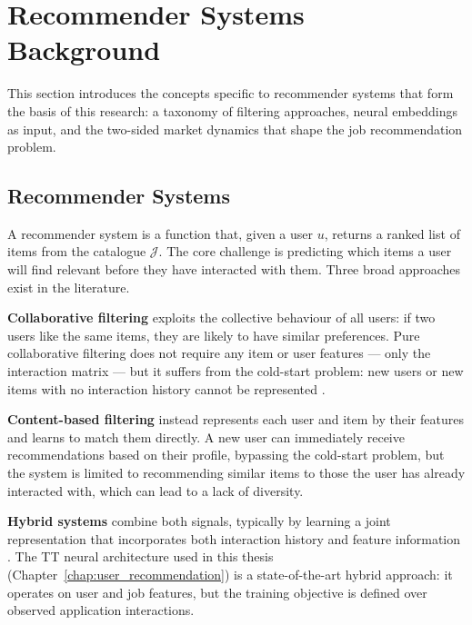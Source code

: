 \section{Recommender Systems Background}
\label{sec:prelim_rs_background}

This section introduces the concepts specific to recommender systems that form the basis of this research: a taxonomy of filtering approaches, neural embeddings as input, and the two-sided market dynamics that shape the job recommendation problem.

\subsection{Recommender Systems}
\label{sec:prelim_rs}

A recommender system is a function that, given a user $u$, returns a ranked list of items from the catalogue $\mathcal{J}$. The core challenge is predicting which items a user will find relevant before they have interacted with them. Three broad approaches exist in the literature.

\textbf{Collaborative filtering} \cite{glauber2019collaborativefilteringvscontentbased} exploits the collective behaviour of all users: if two users like the same items, they are likely to have similar preferences. Pure collaborative filtering does not require any item or user features --- only the interaction matrix --- but it suffers from the cold-start problem: new users or new items with no interaction history cannot be represented \cite{nadimi2014coldstartproblem}. 

\textbf{Content-based filtering} \cite{glauber2019collaborativefilteringvscontentbased} instead represents each user and item by their features and learns to match them directly. A new user can immediately receive recommendations based on their profile, bypassing the cold-start problem, but the system is limited to recommending similar items to those the user has already interacted with, which can lead to a lack of diversity.

\textbf{Hybrid systems} combine both signals, typically by learning a joint representation that incorporates both interaction history and feature information \cite{li2018hybridrecommendationmethodbased}. The \gls{TT} neural architecture used in this thesis (Chapter~\ref{chap:user_recommendation}) is a state-of-the-art hybrid approach: it operates on user and job features, but the training objective is defined over observed application interactions.

